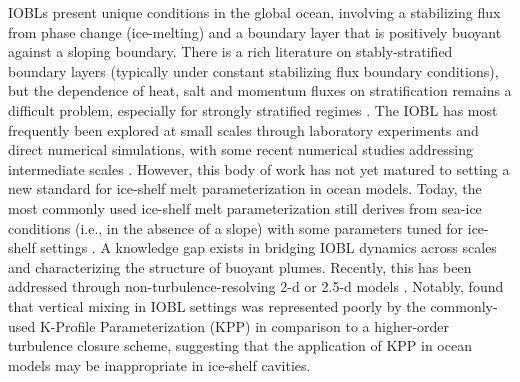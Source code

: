 \documentclass[tc, manuscript]{copernicus}
\begin{document}
IOBLs present unique conditions in the global ocean, involving a stabilizing flux from phase change (ice-melting) and a boundary layer that is positively buoyant against a sloping boundary. There is a rich literature on stably-stratified boundary layers (typically under constant stabilizing flux boundary conditions), but the dependence of heat, salt and momentum fluxes on stratification remains a difficult problem, especially for strongly stratified regimes \citep{zonta_stably_2018}. The IOBL has most frequently been explored at small scales through laboratory experiments and direct numerical simulations, with some recent numerical studies addressing intermediate scales \citep{middleton_numerical_2021, mondal_ablation_2019, vreugdenhil_stratification_2019}. However, this body of work has not yet matured to setting a new standard for ice-shelf melt parameterization in ocean models. Today, the most commonly used ice-shelf melt parameterization still derives from sea-ice conditions (i.e., in the absence of a slope) with some parameters tuned for ice-shelf settings \citep{holland_modeling_1999, jenkins_observation_2010, mcphee_dynamics_1987}. A knowledge gap exists in bridging IOBL dynamics across scales and characterizing the structure of buoyant plumes. Recently, this has been addressed through non-turbulence-resolving 2-d or 2.5-d models \citep{cheng_modeling_2020, jenkins_simple_2016, jenkins_shear_2021}. Notably, \citet{jenkins_shear_2021} found that vertical mixing in IOBL settings was represented poorly by the commonly-used K-Profile Parameterization (KPP) in comparison to a higher-order turbulence closure scheme, suggesting that the application of KPP in ocean models may be inappropriate in ice-shelf cavities. 
\end{document}
